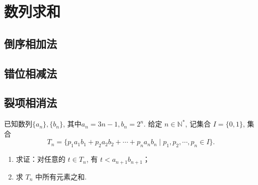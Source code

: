 \section{数列求和}
\subsection{倒序相加法}
\clearpage
\subsection{错位相减法}
\clearpage
\subsection{裂项相消法}
\begin{example}[2025年天津卷19节选]\label{高考:2025年天津卷19下半}
    已知数列\(\{a_n\},\{b_n\}\), 其中\(a_n=3n-1,b_n=2^n\).
    给定 $n \in \mathbb{N}^{*}$, 记集合 $I = \{0, 1\}$, 集合
    \[
    T_n = \{p_1 a_1 b_1 + p_2 a_2 b_2 + \cdots + p_n a_n b_n \mid p_1, p_2, \cdots, p_n \in I\}.
    \]
\begin{enumerate}[label=(\arabic*)]
        \item 求证：对任意的 $t \in T_n$, 有 $t < a_{n+1} b_{n+1}$；
        \item 求 $T_n$ 中所有元素之和.
\end{enumerate}
\end{example}
